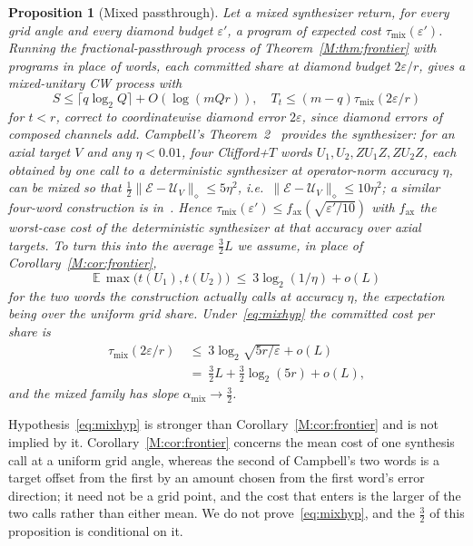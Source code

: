 \documentclass[aps,prx,twocolumn,superscriptaddress,nofootinbib,longbibliography]{revtex4-2}
\theoremstyle{plain}
\newtheorem{proposition}{Proposition}
\theoremstyle{definition}
\theoremstyle{remark}
\newcommand{\E}{\mathbb{E}}
\begin{document}
\begin{proposition}[Mixed passthrough]\label{prop:mixach}
Let a \emph{mixed synthesizer} return, for every grid angle and every diamond budget $\varepsilon'$, a program of expected cost $\tau_{\mathrm{mix}}(\varepsilon')$. Running the fractional-passthrough process of Theorem~\ref{M:thm:frontier} with programs in place of words, each committed share at diamond budget $2\varepsilon/r$, gives a mixed-unitary CW process with
\[
S\le\lceil q\log_2Q\rceil+O(\log(mQr)),\quad T_t\le(m-q)\tau_{\mathrm{mix}}(2\varepsilon/r)
\]
for $t<r$, correct to coordinatewise diamond error $2\varepsilon$, since diamond errors of composed channels add. Campbell's Theorem~2~\cite{Campbell17} provides the synthesizer: for an axial target $V$ and any $\eta<0.01$, four Clifford+$T$ words $U_1,U_2,ZU_1Z,ZU_2Z$, each obtained by one call to a deterministic synthesizer at operator-norm accuracy $\eta$, can be mixed so that $\tfrac12\|\mathcal E-\mathcal U_V\|_\diamond\le5\eta^2$, i.e.\ $\|\mathcal E-\mathcal U_V\|_\diamond\le10\eta^2$; a similar four-word construction is in~\cite{Hastings17}. Hence $\tau_{\mathrm{mix}}(\varepsilon')\le f_{\mathrm{ax}}(\sqrt{\varepsilon'/10})$ with $f_{\mathrm{ax}}$ the \emph{worst-case} cost of the deterministic synthesizer at that accuracy over axial targets. To turn this into the average $\tfrac32L$ we assume, in place of Corollary~\ref{M:cor:frontier},
\begin{equation}\label{eq:mixhyp}
\E\,\max\big(t(U_1),t(U_2)\big)\ \le\ 3\log_2(1/\eta)+o(L)
\end{equation}
for the two words the construction actually calls at accuracy $\eta$, the expectation being over the uniform grid share. Under~\eqref{eq:mixhyp} the committed cost per share is
\[
\begin{aligned}
\tau_{\mathrm{mix}}(2\varepsilon/r)\ &\le\ 3\log_2\sqrt{5r/\varepsilon}+o(L)\\
&=\ \tfrac32L+\tfrac32\log_2(5r)+o(L),
\end{aligned}
\]
and the mixed family has slope $\alpha_{\mathrm{mix}}\to\tfrac32$.
\end{proposition}
Hypothesis~\eqref{eq:mixhyp} is stronger than Corollary~\ref{M:cor:frontier} and is not implied by it. Corollary~\ref{M:cor:frontier} concerns the mean cost of one synthesis call at a uniform grid angle, whereas the second of Campbell's two words is a target offset from the first by an amount chosen from the first word's error direction; it need not be a grid point, and the cost that enters is the larger of the two calls rather than either mean. We do not prove~\eqref{eq:mixhyp}, and the $\tfrac32$ of this proposition is conditional on it.
\end{document}
